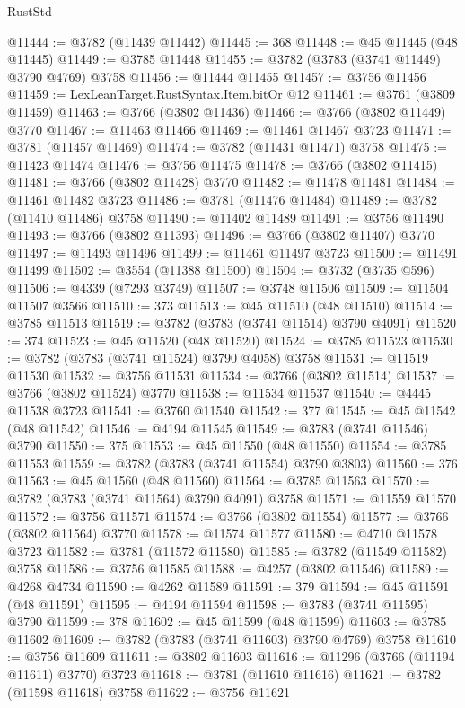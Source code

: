 \begin{lexlean}{RustStd}
\begin{coremodule}
@11444 := @3782 (@11439 @11442)
@11445 := 368
@11448 := @45 @11445 (@48 @11445)
@11449 := @3785 @11448
@11455 := @3782 (@3783 (@3741 @11449) @3790 @4769) @3758
@11456 := @11444 @11455
@11457 := @3756 @11456
@11459 := LexLeanTarget.RustSyntax.Item.bitOr @12
@11461 := @3761 (@3809 @11459)
@11463 := @3766 (@3802 @11436)
@11466 := @3766 (@3802 @11449) @3770
@11467 := @11463 @11466
@11469 := @11461 @11467 @3723
@11471 := @3781 (@11457 @11469)
@11474 := @3782 (@11431 @11471) @3758
@11475 := @11423 @11474
@11476 := @3756 @11475
@11478 := @3766 (@3802 @11415)
@11481 := @3766 (@3802 @11428) @3770
@11482 := @11478 @11481
@11484 := @11461 @11482 @3723
@11486 := @3781 (@11476 @11484)
@11489 := @3782 (@11410 @11486) @3758
@11490 := @11402 @11489
@11491 := @3756 @11490
@11493 := @3766 (@3802 @11393)
@11496 := @3766 (@3802 @11407) @3770
@11497 := @11493 @11496
@11499 := @11461 @11497 @3723
@11500 := @11491 @11499
@11502 := @3554 (@11388 @11500)
@11504 := @3732 (@3735 @596)
@11506 := @4339 (@7293 @3749)
@11507 := @3748 @11506
@11509 := @11504 @11507 @3566
@11510 := 373
@11513 := @45 @11510 (@48 @11510)
@11514 := @3785 @11513
@11519 := @3782 (@3783 (@3741 @11514) @3790 @4091)
@11520 := 374
@11523 := @45 @11520 (@48 @11520)
@11524 := @3785 @11523
@11530 := @3782 (@3783 (@3741 @11524) @3790 @4058) @3758
@11531 := @11519 @11530
@11532 := @3756 @11531
@11534 := @3766 (@3802 @11514)
@11537 := @3766 (@3802 @11524) @3770
@11538 := @11534 @11537
@11540 := @4445 @11538 @3723
@11541 := @3760 @11540
@11542 := 377
@11545 := @45 @11542 (@48 @11542)
@11546 := @4194 @11545
@11549 := @3783 (@3741 @11546) @3790
@11550 := 375
@11553 := @45 @11550 (@48 @11550)
@11554 := @3785 @11553
@11559 := @3782 (@3783 (@3741 @11554) @3790 @3803)
@11560 := 376
@11563 := @45 @11560 (@48 @11560)
@11564 := @3785 @11563
@11570 := @3782 (@3783 (@3741 @11564) @3790 @4091) @3758
@11571 := @11559 @11570
@11572 := @3756 @11571
@11574 := @3766 (@3802 @11554)
@11577 := @3766 (@3802 @11564) @3770
@11578 := @11574 @11577
@11580 := @4710 @11578 @3723
@11582 := @3781 (@11572 @11580)
@11585 := @3782 (@11549 @11582) @3758
@11586 := @3756 @11585
@11588 := @4257 (@3802 @11546)
@11589 := @4268 @4734
@11590 := @4262 @11589
@11591 := 379
@11594 := @45 @11591 (@48 @11591)
@11595 := @4194 @11594
@11598 := @3783 (@3741 @11595) @3790
@11599 := 378
@11602 := @45 @11599 (@48 @11599)
@11603 := @3785 @11602
@11609 := @3782 (@3783 (@3741 @11603) @3790 @4769) @3758
@11610 := @3756 @11609
@11611 := @3802 @11603
@11616 := @11296 (@3766 (@11194 @11611) @3770) @3723
@11618 := @3781 (@11610 @11616)
@11621 := @3782 (@11598 @11618) @3758
@11622 := @3756 @11621

\end{coremodule}
\end{lexlean}
